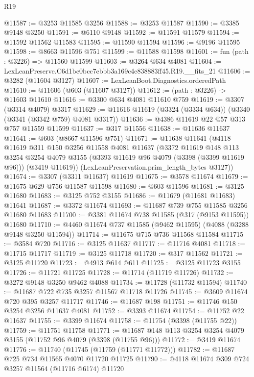 \begin{lexlean}{R19}
\begin{coremodule}
@11587 := @3253 @11585 @3256
@11588 := @3253 @11587
@11590 := @3385 @9148 @3250
@11591 := @6110 @9148
@11592 := @11591 @11579
@11594 := @11592 @11562 @11583
@11595 := @11590 @11594
@11596 := @9196 @11595
@11598 := @8663 @11596 @751
@11599 := @11588 @11598
@11601 := fun (path : @3226) => @11560 @11599
@11603 := @3264 @634 @4081
@11604 := LexLeanPreserve.C6d1bc0bcc7cbbb3a169c4e838883ff45.R19.__fits_21
@11606 := @3282 (@11604 @3127)
@11607 := LexLeanBoot.Diagnostics.orderedPath
@11610 := @11606 (@603 (@11607 @3127))
@11612 := (path : @3226) -> @11603 @11610
@11616 := @3300 @634 @4081 @11610 @759
@11619 := @3307 (@3314 @4079) @3317
@11629 := @11616 @11619 (@3324 (@3334 @634)) (@3340 (@3341 (@3342 @759) @4081 @3317))
@11636 := @4386 @11619 @22 @57 @313 @757 @11559 @11599
@11637 := @317 @11556
@11638 := @11636 @11637
@11641 := @603 (@8667 @11596 @751)
@11671 := @11638
    @11641
    (@4118
      @11619
      @311
      @150
      @3256
      @11558
      @4081
      @11637
      (@3372
        @11619
        @148
        @113
        @3254
        @3254
        @4079
        @3155
        (@3393 @11619 @96 @4079 (@3398 (@3399 @11619 @96)))
        (@3419 @11619))
      (LexLeanPreservation.prim_length_bytes @3127))
@11674 := @3307 (@3311 @11637) @11619
@11675 := @3578 @11674
@11679 := @11675 @629 @756 @11587 @11598
@11680 := @603 @11596
@11681 := @3125 @11680
@11683 := @3125 @752 @3155
@11686 := @11679 (@11681 @11683) @11641
@11687 := @3372 @11674
@11693 := @11687 @739 @755 @11585 @3256 @11680 @11683
@11700 := @3381 @11674 @738 @11585 (@317 (@9153 @11595)) @11680
@11710 := @4460 @11674 @737 @11585 (@9462 @11595) (@4088 (@3288 @9148 @3250 @11594))
@11714 := @11675 @715 @736 @11568 @11584
@11715 := @3584 @720
@11716 := @3125 @11637
@11717 := @11716 @4081
@11718 := @11715 @11717
@11719 := @3125 @11718
@11720 := @317 @11562
@11721 := @3125 @11720
@11723 := @4913 @614 @611
@11725 := @3125 @11723 @3155
@11726 := @11721 @11725
@11728 := @11714 (@11719 @11726)
@11732 := @3272 @9148 @3250 @9462 @4088
@11734 := @11728 (@11732 @11594)
@11740 := @11687 @722 @735 @3257 @11567 @11718 @11726
@11745 := @3609 @11674 @720 @395 @3257 @11717
@11746 := @11687 @198
@11751 := @11746 @150 @3254 @3256 @11637 @4081
@11752 := @3393 @11674
@11754 := @11752 @22 @11637
@11755 := @3399 @11674
@11758 := @11754 (@3398 (@11755 @22))
@11759 := @11751 @11758
@11771 := @11687 @148 @113 @3254 @3254 @4079 @3155 (@11752 @96 @4079 (@3398 (@11755 @96)))
@11772 := @3419 @11674
@11776 := @11740 (@11745 (@11759 (@11771 @11772)))
@11782 := @11687 @725 @734 @11565 @4070 @11720 @11725
@11790 := @4118 @11674 @309 @724 @3257 @11564 (@11716 @6174) @11720

\end{coremodule}
\end{lexlean}
